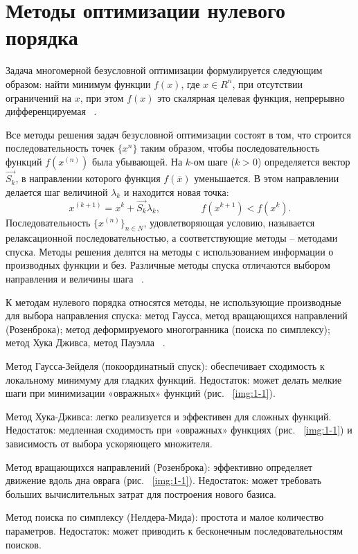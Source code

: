 \section*{Методы оптимизации нулевого порядка}
Задача многомерной безусловной оптимизации формулируется следующим образом: найти минимум функции $f(x)$, где $x \in {R^n}$, при отсутствии ограничений на $x$, при этом $f(x)$ это скалярная целевая функция, непрерывно дифференцируемая ~\cite{b1}.

Все методы решения задач безусловной оптимизации состоят в том, что строится последовательность точек $\{x^n\}$ таким образом, чтобы последовательность функций $f(x^{(n)})$ была убывающей. На $k$-ом шаге ($k>0$) определяется вектор $\vec {S_k}$, в направлении которого функция $f(\overline{x})$ уменьшается. В этом направлении делается шаг величиной $\lambda_k$ и находится новая точка:
\begin{equation}
	x^{(k+1)} = x^k + \vec{S_k} \lambda_k, \hspace{50pt} f(x^{k+1}) < f(x^k).
\end{equation}
Последовательность $\{x^{(n)}\}_{n \in N}$, удовлетворяющая условию, называется релаксационной последовательностью, а соответствующие методы -- методами спуска. Методы решения делятся на методы с использованием информации о производных функции и без. Различные методы спуска отличаются выбором направления и величины шага ~\cite{b1}.

К методам нулевого порядка относятся методы, не использующие производные для выбора направления спуска: метод Гаусса, метод вращающихся направлений (Розенброка); метод деформируемого многогранника (поиска по симплексу); метод Хука Дживса, метод Пауэлла ~\cite{b1}.

Метод Гаусса-Зейделя (покоординатный спуск): обеспечивает сходимость к локальному минимуму для гладких функций. Недостаток: может делать мелкие шаги при минимизации «овражных» функций (рис. ~\ref{img:1-1}).

Метод Хука-Дживса: легко реализуется и эффективен для сложных функций. Недостаток: медленная сходимость при «овражных» функциях (рис. ~\ref{img:1-1}) и зависимость от выбора ускоряющего множителя.

Метод вращающихся направлений (Розенброка): эффективно определяет движение вдоль дна оврага (рис. ~\ref{img:1-1}). Недостаток: может требовать больших вычислительных затрат для построения нового базиса.

Метод поиска по симплексу (Нелдера-Мида): простота и малое количество параметров. Недостаток: может приводить к бесконечным последовательностям поисков.

